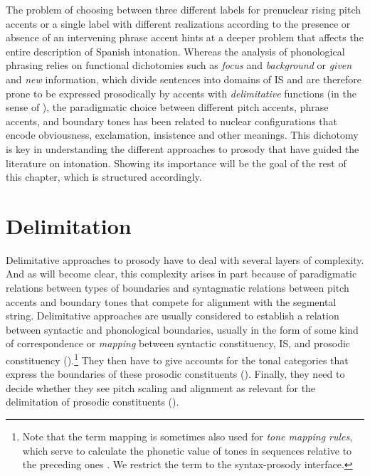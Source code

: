 The problem of choosing between three different labels for prenuclear rising pitch accents or a single label with different realizations according to the presence or absence of an intervening phrase accent hints at a deeper problem that affects the entire description of Spanish intonation. Whereas the analysis of phonological phrasing relies on functional dichotomies such as \textit{focus} and \textit{background} or \textit{given} and \textit{new} information, which divide sentences into domains of \ac{IS} \citep{KrifkaMusan.2012} and are therefore prone to be expressed prosodically by accents with \textit{delimitative} functions (in the sense of \cite[29]{Trubeckoj1939}), the paradigmatic choice between different pitch accents, phrase accents, and boundary tones has been related to nuclear configurations that encode obviousness, exclamation, insistence and other meanings. This dichotomy is key in understanding the different approaches to prosody that have guided the literature on intonation. Showing its importance will be the goal of the rest of this chapter, which is structured accordingly.



\section{Delimitation}
\label{ch:2.2}


Delimitative approaches to prosody have to deal with several layers of 
complexity. And as will become clear, this complexity arises in part because of 
paradigmatic relations between types of boundaries and syntagmatic 
relations between pitch accents and boundary tones that compete for 
alignment with the segmental string. Delimitative approaches are usually considered to 
establish a relation between syntactic and phonological boundaries, 
usually in the form of some kind of correspondence or \textit{mapping} 
between syntactic constituency, \ac{IS}, and prosodic 
constituency ().\footnote{Note that 
the term mapping is sometimes also used for \textit{tone mapping rules}, 
which serve to calculate the phonetic value of tones in sequences relative 
to the preceding ones \citep[105]{Fery.2017}. We restrict the term to the 
syntax-prosody interface.} They then have to give accounts for the tonal 
categories that express the boundaries of these prosodic constituents 
(). Finally, they need to decide whether they see pitch 
scaling and alignment as relevant for the delimitation of prosodic constituents ().

